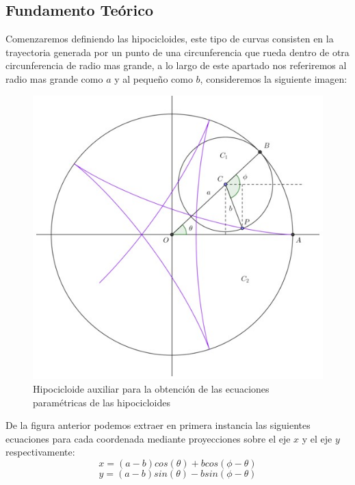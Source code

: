 \documentclass[letterpaper,11pt,dvipsnames]{article}
\begin{document}
\subsection{Fundamento Teórico}
Comenzaremos definiendo las hipocicloides, este tipo de curvas consisten en la trayectoria generada por un punto de una circunferencia que rueda dentro de otra circunferencia de radio mas grande, a lo largo de este apartado nos referiremos al radio mas grande como $a$ y al pequeño como $b$, consideremos la siguiente imagen:



\begin{figure}[H]
    \centering
    \includegraphics[scale=0.485]{hipocicloide.jpg}
    \caption{Hipocicloide auxiliar para la obtención de las ecuaciones paramétricas de las hipocicloides}
    \label{fig:hipocicloide}
\end{figure}

De la figura anterior podemos extraer en primera instancia las siguientes ecuaciones para cada coordenada mediante proyecciones sobre el eje $x$ y el eje $y$ respectivamente:
\[
x=(a-b)cos(\theta)+bcos(\phi - \theta)
\]
\[
y=(a-b)sin(\theta)-bsin(\phi-\theta)
\]
\end{document}
